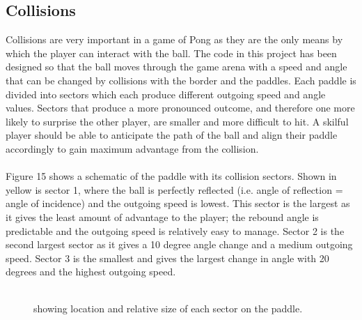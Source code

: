 \documentclass[a4paper,12pt]{article}
\begin{document}
\subsection{Collisions}
\begin{flushleft}
Collisions are very important in a game of Pong as they are the only means by which the player can interact with the ball. The code in this project has been designed so that the ball moves through the game arena with a speed and angle that can be changed by collisions with the border and the paddles. Each paddle is divided into sectors which each produce different outgoing speed and angle values. Sectors that produce a more pronounced outcome, and therefore one more likely to surprise the other player, are smaller and more difficult to hit. A skilful player should be able to anticipate the path of the ball and align their paddle accordingly to gain maximum advantage from the collision. 
\\ \- \\
Figure 15 shows a schematic of the paddle with its collision sectors. Shown in yellow is sector 1, where the ball is perfectly reflected (i.e. angle of reflection = angle of incidence) and the outgoing speed is lowest. This sector is the largest as it gives the least amount of advantage to the player; the rebound angle is predictable and the outgoing speed is relatively easy to manage. Sector 2 is the second largest sector as it gives a 10 degree angle change and a medium outgoing speed. Sector 3 is the smallest and gives the largest change in angle with 20 degrees and the highest outgoing speed. 
\\ \- \\
\begin{figure}[H]
  \centering
  \caption{showing location and relative size of each sector on the paddle.}
\end{figure}
\newpage

\end{flushleft}
\end{document}
